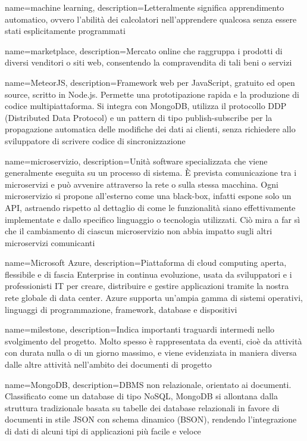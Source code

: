 {
	name=machine learning,
	description={Letteralmente significa apprendimento automatico, ovvero l'abilità dei calcolatori nell'apprendere qualcosa senza essere stati esplicitamente programmati}
}	

{
	name=marketplace,
	description={Mercato online che raggruppa i prodotti di diversi venditori o siti web, consentendo la compravendita di tali beni o servizi}
}

{
	name=MeteorJS,
	description={Framework web per JavaScript, gratuito ed open source, scritto in Node.js. Permette una prototipazione rapida e la produzione di codice multipiattaforma. Si integra con MongoDB, utilizza il protocollo DDP (Distributed Data Protocol) e un pattern di tipo publish-subscribe per la propagazione automatica delle modifiche dei dati ai clienti, senza richiedere allo sviluppatore di scrivere codice di sincronizzazione}
}		

{
	name=microservizio,
	description={Unità software specializzata che viene generalmente eseguita su un processo di sistema. \MakeUppercase{è} prevista comunicazione tra i microservizi e può avvenire attraverso la rete o sulla stessa macchina. Ogni microservizio si propone all’esterno come una black-box, infatti espone solo un API, astraendo rispetto al dettaglio di come le funzionalità siano effettivamente implementate e dallo specifico linguaggio o tecnologia utilizzati. Ciò mira a far sì che il cambiamento di ciascun microservizio non abbia impatto sugli altri microservizi comunicanti}
}

{
	name=Microsoft Azure,
	description={Piattaforma di cloud computing aperta, flessibile e di fascia Enterprise in continua evoluzione, usata da sviluppatori e i professionisti IT per creare, distribuire e gestire applicazioni tramite la nostra rete globale di data center. Azure supporta un'ampia gamma di sistemi operativi, linguaggi di programmazione, framework, database e dispositivi}
}	

{
	name=milestone,
	description={Indica importanti traguardi intermedi nello svolgimento del progetto. Molto spesso è rappresentata da eventi, cioè da attività con durata nulla o di un giorno massimo, e viene evidenziata in maniera diversa dalle altre attività nell'ambito dei documenti di progetto}
}		

{
	name=MongoDB,
	description={DBMS non relazionale, orientato ai documenti. Classificato come un database di tipo NoSQL, MongoDB si allontana dalla struttura tradizionale basata su tabelle dei database relazionali in favore di documenti in stile JSON con schema dinamico (BSON), rendendo l'integrazione di dati di alcuni tipi di applicazioni più facile e veloce}
}	

